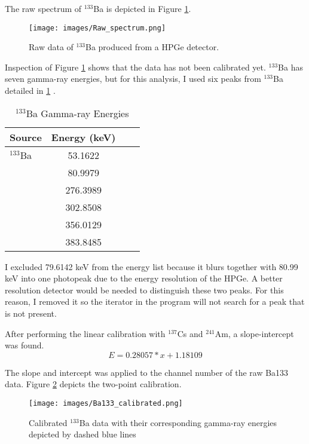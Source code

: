 The raw spectrum of $^{133}$Ba is depicted in Figure \ref{fig:raw_data}.

\begin{figure}[H]
\centering
\texttt{[image: images/Raw\_spectrum.png]}
\caption{Raw data of $^{133}$Ba produced from a HPGe detector.}
\label{fig:raw_data}
\end{figure}

Inspection of Figure \ref{fig:raw_data} shows that the data has not been calibrated yet.
$^{133}$Ba has seven gamma-ray energies, but for this analysis, I used six peaks from $^{133}$Ba
detailed in \ref{table:energy} \cite{Untitled27:online}.

\begin{table}[H]
\caption{$^{133}$Ba Gamma-ray Energies}
\begin{center}
\begin{tabular}{|l|c|c|r|}
\textbf{Source} & \textbf{Energy (keV)}\\
\hline
$^{133}$Ba    &  53.1622 \\
              &  80.9979 \\
              &  276.3989 \\
              & 302.8508  \\
              & 356.0129 \\
              & 383.8485 \\
\hline
\end{tabular}
\end{center}
\label{table:energy}
\end{table}

I excluded 79.6142 keV from the energy list because it blurs together with
80.99 keV into one photopeak due to the energy resolution
of the HPGe. A better resolution detector would be needed to distinguish
these two peaks. For this reason, I removed it so the iterator in the program will
not search for a peak that is not present.

After performing the linear calibration with $^{137}$Cs and $^{241}$Am,
a slope-intercept was found.
\vspace{5mm} %
\begin{equation}
E = 0.28057*x + 1.18109
\end{equation}
\vspace{5mm} %

The slope and intercept was applied to the channel number of the raw Ba133 data.
Figure \ref{fig:CE} depicts the two-point calibration.

\begin{figure}[H]
\centering
\texttt{[image: images/Ba133\_calibrated.png]}
\caption{Calibrated $^{133}$Ba data with their corresponding gamma-ray energies
depicted by dashed blue lines}
\label{fig:CE}
\end{figure}
